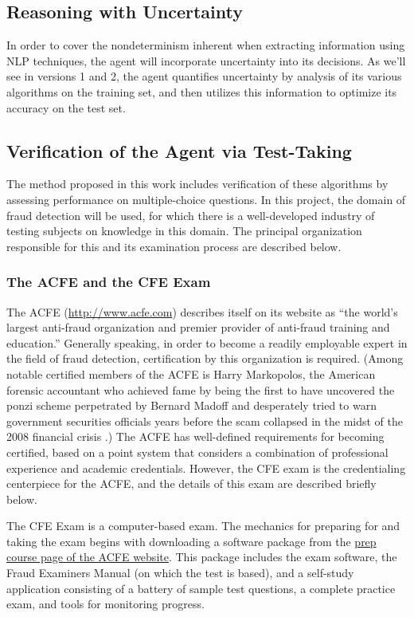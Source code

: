 \subsection{Reasoning with Uncertainty}

In order to cover the nondeterminism inherent when extracting information
using NLP techniques, the agent will incorporate uncertainty into its decisions.  As we'll see
in versions 1 and 2, the agent quantifies uncertainty by analysis of its various algorithms on the 
training set, and then utilizes this information to optimize its accuracy on the test set.

\subsection{Verification of the Agent via Test-Taking}

The method proposed in this work includes verification of these algorithms by assessing performance on multiple-choice questions.  In this project, the domain of fraud detection will be used, for which there is
a well-developed industry of testing subjects on knowledge in this domain.  The principal organization
responsible for this and its examination process are described below.

\subsubsection{The ACFE and the CFE Exam}


The ACFE (\url{http://www.acfe.com}) describes itself on its website as ``the world's largest anti-fraud organization and premier provider of anti-fraud training and education.''  Generally speaking, in order to become a readily employable expert in the field of fraud detection, certification by this organization is required.  (Among notable certified members of the ACFE is Harry Markopolos, the American forensic accountant who achieved fame by being the first to have uncovered the ponzi scheme perpetrated by Bernard Madoff and desperately tried to warn government securities officials years before the scam collapsed in the midst of the 2008 financial crisis \cite{markopolos2010}.)  The ACFE has well-defined requirements for becoming certified, based on a point system that considers a combination of professional experience and academic credentials.  However, the CFE exam is the credentialing centerpiece for the ACFE, and the details of this exam are described briefly below.

The CFE Exam is a computer-based exam.  The mechanics for preparing for and taking the exam begins with downloading a software package from the \href{http://www.acfe.com/CFE-Exam-Prep-Course-List.aspx}{prep course page of the ACFE website}.  This package includes the exam software, the Fraud Examiners Manual (on which the test is based), and a self-study application consisting of a battery of sample test questions, a complete practice exam, and tools for monitoring progress.  

